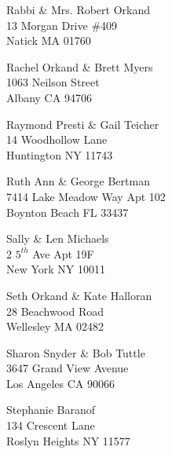\documentclass{article}
\begin{document}
\begin{center}
\begin{Huge}
\clearpage

\vspace*{\fill}
Rabbi \& Mrs. Robert Orkand\\
13 Morgan Drive \#409\\
Natick MA 01760\\
\vspace{\fill}

\clearpage

\vspace*{\fill}
Rachel Orkand \& Brett Myers\\
1063 Neilson Street\\
Albany CA 94706\\
\vspace{\fill}

\clearpage

\vspace*{\fill}
Raymond Presti \& Gail Teicher\\
14 Woodhollow Lane\\
Huntington NY 11743\\
\vspace{\fill}

\clearpage

\vspace*{\fill}
Ruth Ann \& George Bertman\\
7414 Lake Meadow Way Apt 102\\
Boynton Beach FL 33437\\
\vspace{\fill}

\clearpage

\vspace*{\fill}
Sally \& Len Michaels\\
2 $5^{th}$ Ave Apt 19F\\
New York NY 10011\\
\vspace{\fill}

\clearpage

\vspace*{\fill}
Seth Orkand \& Kate Halloran\\
28 Beachwood Road\\
Wellesley MA 02482\\
\vspace{\fill}

\clearpage

\vspace*{\fill}
Sharon Snyder \& Bob Tuttle\\
3647 Grand View Avenue\\
Los Angeles CA 90066\\
\vspace{\fill}

\clearpage

\vspace*{\fill}
Stephanie Baranof\\
134 Crescent Lane\\
Roslyn Heights NY 11577\\
\vspace{\fill}

\clearpage

\end{Huge}
\end{center}
\end{document}

